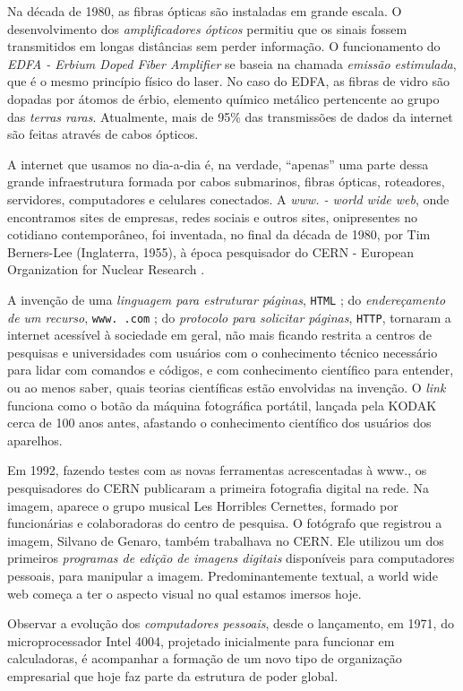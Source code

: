 \documentclass{hipatia}
\begin{document}
Na década de 1980, as fibras ópticas são instaladas em grande escala. O desenvolvimento dos \textit{amplificadores ópticos} permitiu que os sinais fossem transmitidos em longas distâncias sem perder informação. O funcionamento do \textit{EDFA - Erbium Doped Fiber Amplifier} se baseia na chamada \textit{emissão estimulada}, que é o mesmo princípio físico do laser. No caso do EDFA, as fibras de vidro são dopadas por átomos de érbio, elemento químico metálico pertencente ao grupo das \textit{terras raras}. Atualmente, mais de 95\% das transmissões de dados da internet são feitas através de cabos ópticos.

A internet que usamos no dia-a-dia é, na verdade, ``apenas'' uma parte dessa grande infraestrutura formada por cabos submarinos, fibras ópticas, roteadores, servidores, computadores e celulares conectados. A \textit{www. - world wide web}, onde encontramos sites de empresas, redes sociais e outros sites, onipresentes no cotidiano contemporâneo, foi inventada, no final da década de 1980, por Tim Berners-Lee (Inglaterra, 1955), à época pesquisador do CERN - European Organization for Nuclear Research \cite{BernersLee1999}.

A invenção de uma \textit{linguagem para estruturar páginas}, \verb|HTML| ; do \textit{endereçamento de um recurso}, \verb|www. .com| ; do \textit{protocolo para solicitar páginas}, \verb|HTTP|, tornaram a internet acessível à sociedade em geral, não mais ficando restrita a centros de pesquisas e universidades com usuários com o conhecimento técnico necessário para lidar com comandos e códigos, e com conhecimento científico para entender, ou ao menos saber, quais teorias científicas estão envolvidas na invenção. O \textit{link} funciona como o botão da máquina fotográfica portátil, lançada pela KODAK cerca de 100 anos antes, afastando o conhecimento científico dos usuários dos aparelhos.

Em 1992, fazendo testes com as novas ferramentas acrescentadas à www., os pesquisadores do CERN publicaram a primeira fotografia digital na rede. Na imagem, aparece o grupo musical Les Horribles Cernettes, formado por funcionárias e colaboradoras do centro de pesquisa. O fotógrafo que registrou a imagem, Silvano de Genaro, também trabalhava no CERN. Ele utilizou um dos primeiros \textit{programas de edição de imagens digitais} disponíveis para computadores pessoais, para manipular a imagem. Predominantemente textual, a world wide web começa a ter o aspecto visual no qual estamos imersos hoje.

Observar a evolução dos \textit{computadores pessoais}, desde o lançamento, em 1971, do microprocessador Intel 4004, projetado inicialmente para funcionar em calculadoras, é acompanhar a formação de um novo tipo de organização empresarial que hoje faz parte da estrutura de poder global.
\end{document}
